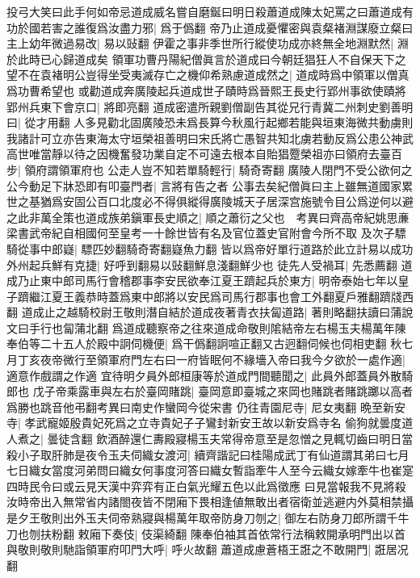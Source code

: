 投弓大笑曰此手何如帝忌道成威名嘗自磨鋋曰明日殺蕭道成陳太妃罵之曰蕭道成有功於國若害之誰復爲汝盡力邪|{
	爲于僞翻}
帝乃止道成憂懼密與袁粲褚淵謀廢立粲曰主上幼年微過易改|{
	易以䜴翻}
伊霍之事非季世所行縱使功成亦終無全地淵默然|{
	淵於此時已心歸道成矣}
領軍功曹丹陽紀僧眞言於道成曰今朝廷猖狂人不自保天下之望不在袁褚明公豈得坐受夷滅存亡之機仰希熟慮道成然之|{
	道成時爲中領軍以僧真爲功曹希望也}
或勸道成奔廣陵起兵道成世子賾時爲晉熙王長史行郢州事欲使賾將郢州兵東下會京口|{
	將即亮翻}
道成密遣所親劉僧副告其從兄行青冀二州刺史劉善明曰|{
	從才用翻}
人多見勸北固廣陵恐未爲長算今秋風行起鄉若能與垣東海微共動虜則我諸計可立亦告東海太守垣榮祖善明曰宋氏將亡愚智共知北虜若動反爲公患公神武高世唯當靜以待之因機奮發功業自定不可遠去根本自貽猖蹷榮祖亦曰領府去臺百步|{
	領府謂領軍府也}
公走人豈不知若單騎輕行|{
	騎奇寄翻}
廣陵人閉門不受公欲何之公今動足下牀恐即有叩臺門者|{
	言將有告之者}
公事去矣紀僧眞曰主上雖無道國家累世之基猶爲安固公百口北度必不得俱縱得廣陵城天子居深宫施號令目公爲逆何以避之此非萬全策也道成族弟鎭軍長史順之|{
	順之蕭衍之父也　考異曰齊高帝紀姚思亷梁書武帝紀自相國何至皇考一十餘世皆有名及官位蓋史官附會今所不取}
及次子驃騎從事中郎嶷|{
	驃匹妙翻騎奇寄翻嶷魚力翻}
皆以爲帝好單行道路於此立計易以成功外州起兵鮮有克捷|{
	好呼到翻易以䜴翻鮮息淺翻鮮少也}
徒先人受禍耳|{
	先悉薦翻}
道成乃止東中郎司馬行會稽郡事李安民欲奉江夏王躋起兵於東方|{
	明帝泰始七年以皇子躋繼江夏王義恭時蓋爲東中郎將以安民爲司馬行郡事也會工外翻夏戶雅翻躋牋西翻}
道成止之越騎校尉王敬則潛自結於道成夜著青衣扶匐道路|{
	著則略翻扶讀曰蒲說文曰手行也匐蒲北翻}
爲道成聽察帝之往來道成命敬則隂結帝左右楊玉夫楊萬年陳奉伯等二十五人於殿中詗伺機便|{
	爲干僞翻詗喧正翻又古迥翻伺候也伺相吏翻}
秋七月丁亥夜帝微行至領軍府門左右曰一府皆眠何不緣墻入帝曰我今夕欲於一處作適|{
	適意作戲謂之作適}
宜待明夕員外郎桓康等於道成門間聽聞之|{
	此員外郎蓋員外散騎郎也}
戊子帝乘露車與左右於臺岡賭跳|{
	臺岡意即臺城之來岡也賭跳者賭跳躑以高者爲勝也跳音他弔翻考異曰南史作蠻岡今從宋書}
仍往青園尼寺|{
	尼女夷翻}
晩至新安寺|{
	孝武寵姬殷貴妃死爲之立寺貴妃子子鸞封新安王故以新安爲寺名}
偷狗就曇度道人煮之|{
	曇徒含翻}
飲酒醉還仁夀殿寢楊玉夫常得帝意至是忽憎之見輒切齒曰明日當殺小子取肝肺是夜令玉夫伺織女渡河|{
	續齊諧記曰桂陽成武丁有仙道謂其弟曰七月七日織女當度河弟問曰織女何事度河答曰織女暫詣牽牛人至今云織女嫁牽牛也崔寔四時民令曰或云見天漢中弈弈有正白氣光耀五色以此爲徵應}
曰見當報我不見將殺汝時帝出入無常省内諸閤夜皆不閉廂下畏相逢値無敢出者宿衛並逃避内外莫相禁攝是夕王敬則出外玉夫伺帝熟寢與楊萬年取帝防身刀刎之|{
	御左右防身刀郎所謂千牛刀也刎扶粉翻}
敕廂下奏伎|{
	伎渠綺翻}
陳奉伯袖其首依常行法稱敕開承明門出以首與敬則敬則馳詣領軍府叩門大呼|{
	呼火故翻}
蕭道成慮蒼梧王誑之不敢開門|{
	誑居况翻}
